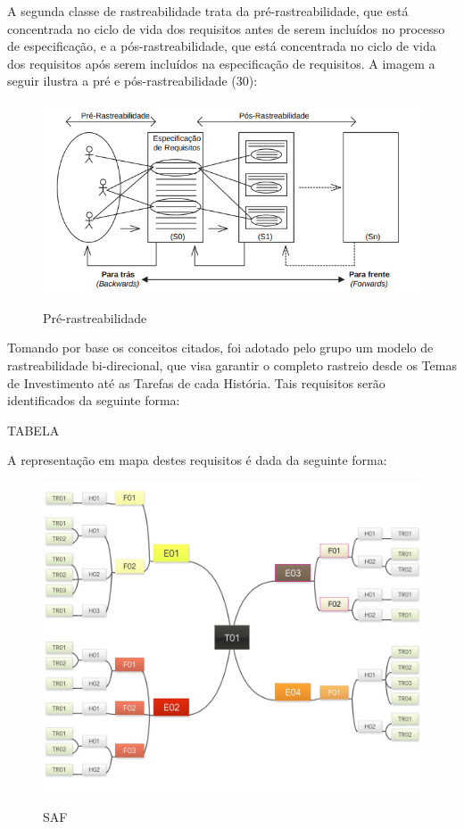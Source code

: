 A segunda classe de rastreabilidade trata da pré-rastreabilidade, que está concentrada no ciclo de vida dos requisitos antes de serem incluídos no processo de especificação, e a pós-rastreabilidade, que está concentrada no ciclo de vida dos requisitos após serem incluídos na especificação de requisitos. A imagem a seguir ilustra a pré e pós-rastreabilidade (30):


\FloatBarrier
\begin{figure}[!htpd]
		\centering
		\caption{Pré-rastreabilidade}
		\includegraphics[scale=0.8]{figuras/rastrabilidadepre}
		\label{img:SAF}
\end{figure}
\FloatBarrier

Tomando por base os conceitos citados, foi adotado pelo grupo um modelo de rastreabilidade bi-direcional, que visa garantir o completo rastreio desde os Temas de Investimento até as Tarefas de cada História. Tais requisitos serão identificados da seguinte forma:

TABELA

A representação em mapa destes requisitos é dada da seguinte forma:

\FloatBarrier
\begin{figure}[!htpd]
		\centering
		\caption{SAF}
		\includegraphics[scale=0.27]{figuras/T01}
		\label{img:SAF}
\end{figure}
\FloatBarrier
